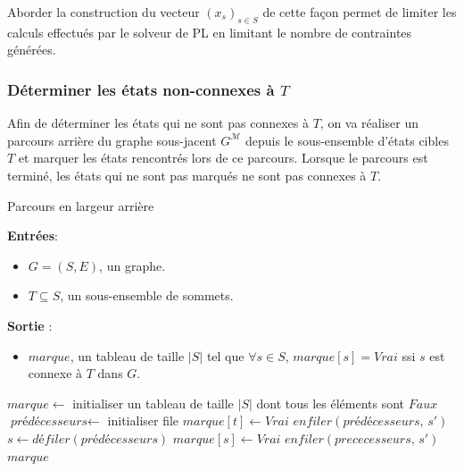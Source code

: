 \documentclass[12pt,a4paper]{report}
\theoremstyle{definition}%
\theoremstyle{remark}
\let\labelitemi\labelitemii
\begin{document}
Aborder la construction du vecteur $(x_s)_{s \in S}$ de cette façon permet de
limiter les calculs effectués par le solveur de PL en limitant le nombre de
contraintes générées.

\subsubsection*{Déterminer les états non-connexes à $T$}
Afin de déterminer les états qui ne sont pas connexes à $T$, on va réaliser un
parcours arrière du graphe sous-jacent $G^\mathcal{M}$ depuis le sous-ensemble
d'états cibles $T$ et marquer les états rencontrés lors de ce parcours.
Lorsque le parcours est terminé, les états qui ne sont pas marqués ne sont pas
connexes à $T$.

\begin{algorithm}[H]
\caption{Parcours en largeur arrière}
\hspace*{\algorithmicindent} \textbf{Entrées}:
	\begin{itemize}
		\renewcommand{\labelitemi}{\tiny$\bullet$}
		\item $G=(S, E)$, un graphe.
		\item $T \subseteq S$, un sous-ensemble de sommets.
	\end{itemize}
\hspace*{\algorithmicindent} \textbf{Sortie} :
\begin{itemize}
	\renewcommand{\labelitemi}{\tiny$\bullet$}
	\item $marque$, un tableau de taille
	$|S|$ tel que $\forall s \in S$, $marque[s] = Vrai$ ssi $s$ est connexe à $T$
	dans $G$.
\end{itemize}
\begin{algorithmic}[1]
\STATE $marque \gets $ initialiser un tableau de taille $|S|$ dont tous les
	éléments sont $Faux$
\STATE $\textit{prédécesseurs} \gets $ initialiser file
	\STATE $marque[t] \gets Vrai$
		\STATE $enfiler(\textit{prédécesseurs},\, s')$
	\ENDFOR
\ENDFOR
{}
	\STATE $s \gets \textit{défiler}(\textit{prédécesseurs})$
		\STATE $marque[s] \gets Vrai$
			\STATE $enfiler(prececesseurs,\, s')$
		\ENDFOR
	\ENDIF
\ENDWHILE
\RETURN $marque$
\end{algorithmic}
\end{algorithm}
\end{document}
